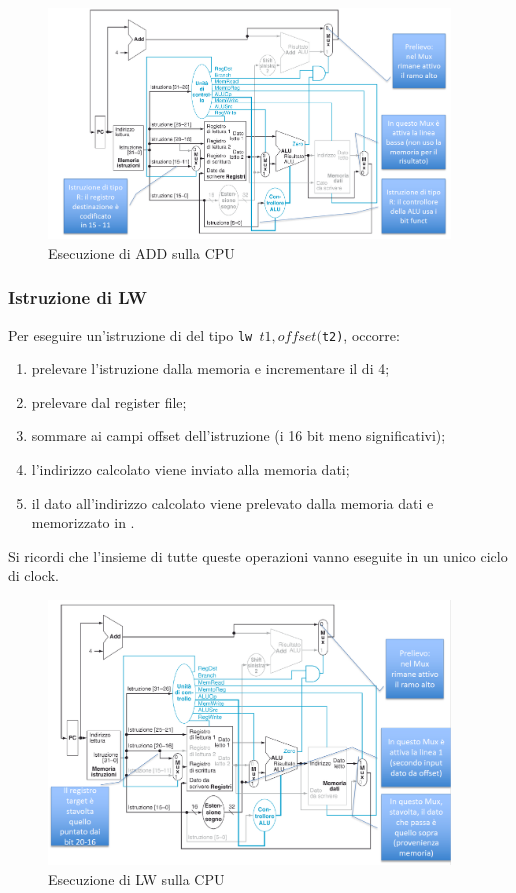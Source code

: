 \documentclass[class=book, crop=false, oneside]{standalone}
\begin{document}
\begin{figure}[H]
	\centering
	\includegraphics[width=0.95\textwidth,keepaspectratio]{es_add.png}
	\caption{Esecuzione di ADD sulla CPU}
\end{figure}

\subsubsection{Istruzione di LW}
Per eseguire un'istruzione di  del tipo \texttt{lw $t1, offset($t2)}, occorre:
\begin{enumerate}
	\item prelevare l’istruzione dalla memoria e incrementare il  di 4;
	\item prelevare  dal register file;
	\item sommare  ai campi offset dell’istruzione (i 16 bit meno significativi);
	\item l'indirizzo calcolato viene inviato alla memoria dati;
	\item il dato all'indirizzo calcolato viene prelevato dalla memoria dati e memorizzato in .
\end{enumerate}
Si ricordi che l'insieme di tutte queste operazioni vanno eseguite in un unico ciclo di clock.

\begin{figure}[H]
	\centering
	\includegraphics[width=0.95\textwidth,keepaspectratio]{es_lw.png}
	\caption{Esecuzione di LW sulla CPU}
\end{figure}
\end{document}
